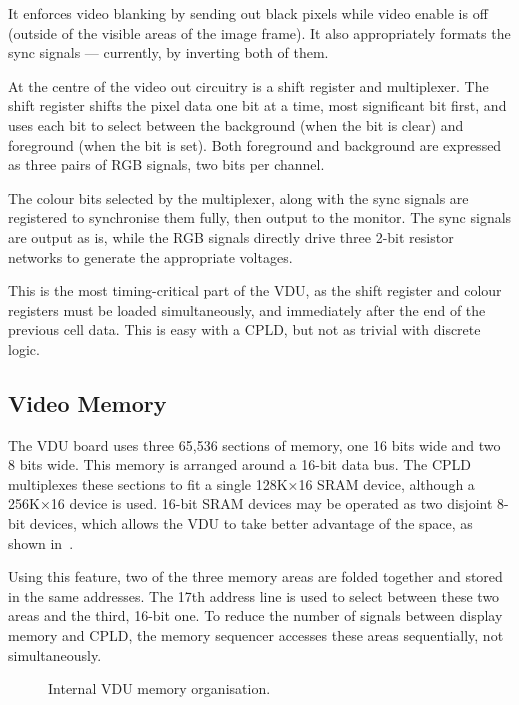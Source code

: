 It enforces video blanking by sending out black pixels while video enable is
off (outside of the visible areas of the image frame). It also appropriately
formats the sync signals — currently, by inverting both of them.

At the centre of the video out circuitry is a shift register and
multiplexer. The shift register shifts the pixel data one bit at a time, most
significant bit first, and uses each bit to select between the background (when
the bit is clear) and foreground (when the bit is set). Both foreground and
background are expressed as three pairs of RGB signals, two bits per
channel.

The colour bits selected by the multiplexer, along with the sync signals are
registered to synchronise them fully, then output to the monitor. The sync
signals are output as is, while the RGB signals directly drive three 2-bit
resistor networks to generate the appropriate voltages.

This is the most timing-critical part of the VDU, as the shift register and
colour registers must be loaded simultaneously, and immediately after the end
of the previous cell data. This is easy with a CPLD, but not as trivial with
discrete logic.



\subsection{Video Memory}
\label{sec:vdu:memory-org}

The VDU board uses three 65,536 sections of memory, one 16 bits wide and two 8
bits wide. This memory is arranged around a 16-bit data bus. The CPLD
multiplexes these sections to fit a single 128K×16 SRAM device, although a
256K×16 device is used. 16-bit SRAM devices may be operated as two disjoint
8-bit devices, which allows the VDU to take better advantage of the space, as
shown in~.

Using this feature, two of the three memory areas are folded together and
stored in the same addresses. The 17th address line is used to select between
these two areas and the third, 16-bit one. To reduce the number of signals
between display memory and CPLD, the memory sequencer accesses these areas
sequentially, not simultaneously.

\begin{figure}
 \centering
 \caption[VDU Memory Map]{\label{fig:vdu-memory-map} Internal VDU memory organisation.}
\end{figure}

